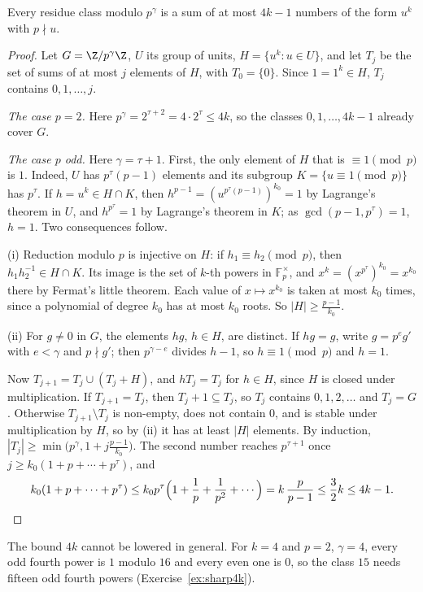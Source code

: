 \begin{lemma}\label{lem:localsol}
Every residue class modulo $p^\gamma$ is a sum of at most $4k-1$ numbers of the form $u^k$ with $p\nmid u$.
\end{lemma}
\begin{proof}
Let $G=\Z/p^\gamma\Z$, $U$ its group of units, $H=\{u^k:u\in U\}$, and let $T_j$ be the set of sums of at most $j$ elements of $H$, with $T_0=\{0\}$. Since $1=1^k\in H$, $T_j$ contains $0,1,\dots,j$.

\emph{The case $p=2$.} Here $p^\gamma=2^{\tau+2}=4\cdot2^\tau\le4k$, so the classes $0,1,\dots,4k-1$ already cover $G$.

\emph{The case $p$ odd.} Here $\gamma=\tau+1$. First, the only element of $H$ that is $\equiv1\pmod p$ is $1$. Indeed, $U$ has $p^\tau(p-1)$ elements and its subgroup $K=\{u\equiv1\pmod p\}$ has $p^\tau$. If $h=u^k\in H\cap K$, then $h^{p-1}=(u^{p^\tau(p-1)})^{k_0}=1$ by Lagrange's theorem in $U$, and $h^{p^\tau}=1$ by Lagrange's theorem in $K$; as $\gcd(p-1,p^\tau)=1$, $h=1$. Two consequences follow.

(i) Reduction modulo $p$ is injective on $H$: if $h_1\equiv h_2\pmod p$, then $h_1h_2^{-1}\in H\cap K$. Its image is the set of $k$-th powers in $\mathbb F_p^\times$, and $x^k=(x^{p^\tau})^{k_0}=x^{k_0}$ there by Fermat's little theorem. Each value of $x\mapsto x^{k_0}$ is taken at most $k_0$ times, since a polynomial of degree $k_0$ has at most $k_0$ roots. So $|H|\ge\frac{p-1}{k_0}$.

(ii) For $g\ne0$ in $G$, the elements $hg$, $h\in H$, are distinct. If $hg=g$, write $g=p^eg'$ with $e<\gamma$ and $p\nmid g'$; then $p^{\gamma-e}$ divides $h-1$, so $h\equiv1\pmod p$ and $h=1$.

Now $T_{j+1}=T_j\cup(T_j+H)$, and $hT_j=T_j$ for $h\in H$, since $H$ is closed under multiplication. If $T_{j+1}=T_j$, then $T_j+1\subseteq T_j$, so $T_j$ contains $0,1,2,\dots$ and $T_j=G$. Otherwise $T_{j+1}\setminus T_j$ is non-empty, does not contain $0$, and is stable under multiplication by $H$, so by (ii) it has at least $|H|$ elements. By induction, $|T_j|\ge\min\bigl(p^\gamma,1+j\frac{p-1}{k_0}\bigr)$. The second number reaches $p^{\tau+1}$ once $j\ge k_0(1+p+\cdots+p^\tau)$, and
\[
k_0(1+p+\cdots+p^\tau)\le k_0p^\tau\Bigl(1+\frac1p+\frac1{p^2}+\cdots\Bigr)=k\,\frac p{p-1}\le\frac32k\le4k-1.\qedhere
\]
\end{proof}

The bound $4k$ cannot be lowered in general. For $k=4$ and $p=2$, $\gamma=4$, every odd fourth power is $1$ modulo $16$ and every even one is $0$, so the class $15$ needs fifteen odd fourth powers (Exercise~\ref{ex:sharp4k}).

